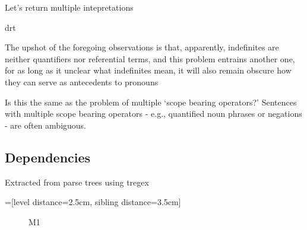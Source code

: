 \documentclass[12pt]{article}
\begin{document}
Let's return multiple intepretations

drt

The upshot of the foregoing observations is that, apparently, indefinites are neither quantifiers nor referential terms, and this problem entrains another one, for as long as it unclear what indefinites mean, it will also remain obscure how they can serve as antecedents to pronouns

Is this the same as the problem of multiple `scope bearing operators?'
Sentences with multiple scope bearing operators - e.g.,
quantified noun phrases or negations - are often ambiguous.


\subsection{Dependencies}

Extracted from parse trees using tregex\cite{de2006generating}

=[level distance=2.5cm, sibling distance=3.5cm]
\begin{figure}
\centering
{}
\caption{M1} \label{fig:M1}
\end{figure}
\end{document}

